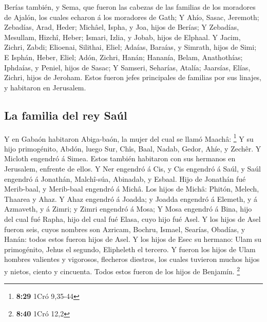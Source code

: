  Berías también, y Sema, que fueron las cabezas de las
familias de los moradores de Ajalón, los cuales echaron á los moradores
de Gath;  Y Ahío, Sasac, Jeremoth;  Zebadías,
Arad, Heder;  Michâel, Ispha, y Joa, hijos de Berías;
 Y Zebadías, Mesullam, Hizchî, Heber;  Ismari,
Izlia, y Jobab, hijos de Elphaal.  Y Jacim, Zichri, Zabdi;
 Elioenai, Silithai, Eliel;  Adaías, Baraías,
y Simrath, hijos de Simi;  E Isphán, Heber, Eliel;
 Adón, Zichri, Hanán;  Hananía, Belam,
Anathothías;  Iphdaías, y Peniel, hijos de Sasac;
 Y Samseri, Seharías, Atalía;  Jaarsías,
Elías, Zichri, hijos de Jeroham.  Estos fueron jefes
principales de familias por sus linajes, y habitaron en Jerusalem.

\hypertarget{la-familia-del-rey-sauxfal}{%
\subsection{La familia del rey Saúl}\label{la-familia-del-rey-sauxfal}}

 Y en Gabaón habitaron Abiga-baón, la mujer del cual se
llamó Maachâ: \footnote{\textbf{8:29} 1Cró 9,35-44}  Y su
hijo primogénito, Abdón, luego Sur, Chîs, Baal, Nadab, 
Gedor, Ahíe, y Zechêr.  Y Micloth engendró á Simea. Estos
también habitaron con sus hermanos en Jerusalem, enfrente de ellos.
 Y Ner engendró á Cis, y Cis engendró á Saúl, y Saúl
engendró á Jonathán, Malchî-súa, Abinadab, y Esbaal.  Hijo
de Jonathán fué Merib-baal, y Merib-baal engendró á Michâ. 
Los hijos de Michâ: Phitón, Melech, Thaarea y Ahaz.  Y Ahaz
engendró á Joadda; y Joadda engendró á Elemeth, y á Azmaveth, y á Zimri;
y Zimri engendró á Mosa;  Y Mosa engendró á Bina, hijo del
cual fué Rapha, hijo del cual fué Elasa, cuyo hijo fué Asel.
 Y los hijos de Asel fueron seis, cuyos nombres son
Azricam, Bochru, Ismael, Searías, Obadías, y Hanán: todos estos fueron
hijos de Asel.  Y los hijos de Esec su hermano: Ulam su
primogénito, Jehus el segundo, Elipheleth el tercero.  Y
fueron los hijos de Ulam hombres valientes y vigorosos, flecheros
diestros, los cuales tuvieron muchos hijos y nietos, ciento y cincuenta.
Todos estos fueron de los hijos de Benjamín. \footnote{\textbf{8:40}
  1Cró 12,2}

